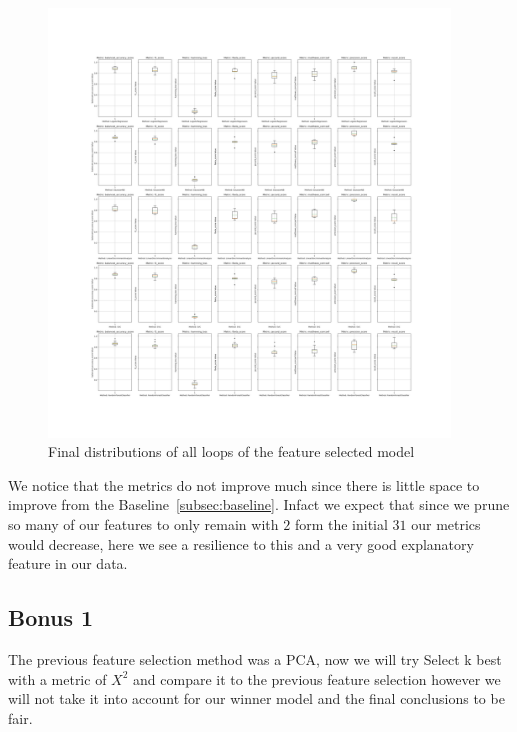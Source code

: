 \documentclass[12pt, a4paper]{article}
\begin{document}
\begin{figure}[H]
    \begin{center}
        \includegraphics[width=0.95\textwidth]{figures/RNCV/FeatureSelection/All loop outer folds boxplots.png}
        \caption{Final distributions of all loops of the feature selected model}\label{fig:fs model desc}
    \end{center}
\end{figure}

\begin{multicols}{2}

    We notice that the metrics do not improve much since there is little space to improve from the Baseline~\ref{subsec:baseline}. Infact we expect that since we prune so many of our features to only remain with $2$ form the initial $31$ our metrics would decrease, here we see a resilience to this and a very good explanatory feature in our data.
    \newlin

    \subsection{Bonus 1} \label{subsec:bonus}

    The previous feature selection method was a PCA, now we will try Select k best with a metric of $X^2$ and compare it to the previous feature selection however we will not take it into account for our winner model and the final conclusions to be fair.
    \newline

\end{multicols}
\end{document}
